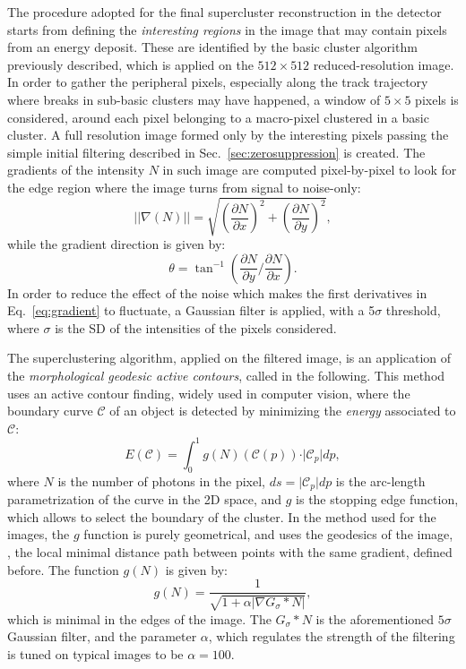 The procedure adopted for the final supercluster reconstruction in the
\lemon detector starts from defining the \textit{interesting regions}
in the image that may contain pixels from an energy deposit. These are
identified by the basic cluster algorithm \idbscan previously
described, which is applied on the $512\times512$ reduced-resolution
image. In order to gather the peripheral pixels, especially along the
track trajectory where breaks in sub-basic clusters may have happened,
a window of $5\times5$ pixels is considered, around each pixel
belonging to a macro-pixel clustered in a basic cluster. A full
resolution image formed only by the interesting pixels passing the
simple initial filtering described in Sec.~\ref{sec:zerosuppression}
is created.  The gradients of the intensity $N$ in such image are
computed pixel-by-pixel to look for the edge region where the image
turns from signal to noise-only:
%
\begin{equation}
\label{eq:gradient}
\vert\vert\nabla(N)\vert\vert =
\sqrt{\left(\frac{\partial N}{\partial x}\right)^2
  +\left(\frac{\partial N}{\partial y}\right)^2},
\end{equation}
%
while the gradient direction is given by:
\begin{equation}
  \label{eq:graddir}
  \theta = \tan^{-1}\left(\frac{\partial N}{\partial y}/\frac{\partial N}{\partial x}\right).
\end{equation}
%
In order to reduce the effect of the noise which makes the first
derivatives in Eq.~\ref{eq:gradient} to fluctuate, a Gaussian filter
is applied, with a 5$\sigma$ threshold, where $\sigma$ is the SD of
the intensities of the pixels considered.

The superclustering algorithm, applied on the filtered image, is an
application of the \textit{morphological geodesic active
contours}\cite{gac,mgac}, called \gac in the following.  This method
uses an active contour finding, widely used in computer vision, where
the boundary curve $\mathcal{C}$ of an object is detected by
minimizing the \textit{energy} associated to $\mathcal{C}$:
\begin{equation}
  \label{eq:gacenergy}
  E(\mathcal{C}) = \int_{0}^{1} g(N)(\mathcal{C}(p)) \cdot \vert\mathcal{C}_p\vert dp,
\end{equation}
where $N$ is the number of photons in the pixel,
$ds=\vert\mathcal{C}_p\vert dp$ is the arc-length parametrization of
the curve in the 2D space, and $g$ is the stopping edge function,
which allows to select the boundary of the cluster.  In the \gac
method used for the \lemon images, the $g$ function is purely
geometrical, and uses the geodesics of the image, \ie, the local
minimal distance path between points with the same gradient, defined
before. The function $g(N)$ is given by:
\begin{equation}
g(N) = \frac{1}{\sqrt{1+\alpha\vert\nabla G_\sigma * N\vert}},
\end{equation}
which is minimal in the edges of the image.  The $G_\sigma * N$ is the
aforementioned $5\sigma$ Gaussian filter, and the parameter $\alpha$,
which regulates the strength of the filtering is tuned on
typical \lemon images to be $\alpha=100$.

